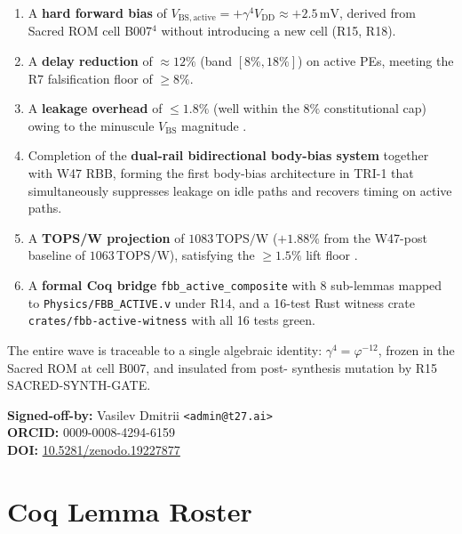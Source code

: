 \documentclass[12pt,a4paper]{report}
\theoremstyle{plain}
\theoremstyle{definition}
\theoremstyle{remark}
\newcommand{\vbs}{V_{\mathrm{BS,active}}}
\newcommand{\vdd}{V_{\mathrm{DD}}}
\newcommand{\gammaFour}{\gamma^{4}}
\newcommand{\phiInvTwelve}{\varphi^{-12}}
\newcommand{\topsw}{\mathrm{TOPS/W}}
\begin{document}
\begin{enumerate}[leftmargin=2em]
  \item A \textbf{hard forward bias} of $\vbs = +\gammaFour \vdd \approx +2.5\,\mathrm{mV}$,
        derived from Sacred ROM cell B007$^{4}$ without introducing a new cell (R15, R18).
  \item A \textbf{delay reduction} of $\approx 12\%$ (band $[8\%,18\%]$) on active PEs, meeting
        the R7 falsification floor of $\geq 8\%$.
  \item A \textbf{leakage overhead} of $\leq 1.8\%$ (well within the $8\%$ constitutional cap)
        owing to the minuscule $V_{\mathrm{BS}}$ magnitude \citep{mukhopadhyay_2009}.
  \item Completion of the \textbf{dual-rail bidirectional body-bias system} together with W47
        RBB, forming the first body-bias architecture in TRI-1 that simultaneously suppresses
        leakage on idle paths and recovers timing on active paths.
  \item A \textbf{TOPS/W projection} of $1083\,\topsw$ ($+1.88\%$ from the W47-post baseline
        of $1063\,\topsw$), satisfying the $\geq 1.5\%$ lift floor \citep{tschanz_jssc_2002}.
  \item A \textbf{formal Coq bridge} \texttt{fbb\_active\_composite} with 8 sub-lemmas mapped
        to \texttt{Physics/FBB\_ACTIVE.v} under R14, and a 16-test Rust witness crate
        \texttt{crates/fbb-active-witness} with all 16 tests green.
\end{enumerate}

The entire wave is traceable to a single algebraic identity:
$\gammaFour = \phiInvTwelve$, frozen in the Sacred ROM at cell B007, and insulated from post-
synthesis mutation by R15 SACRED-SYNTH-GATE.

\bigskip
\noindent\textbf{Signed-off-by:} Vasilev Dmitrii \texttt{<admin@t27.ai>} \\
\textbf{ORCID:} 0009-0008-4294-6159 \\
\textbf{DOI:} \href{https://doi.org/10.5281/zenodo.19227877}{10.5281/zenodo.19227877}

\appendix

\chapter{Coq Lemma Roster}
\label{app:coq_roster}
\end{document}
